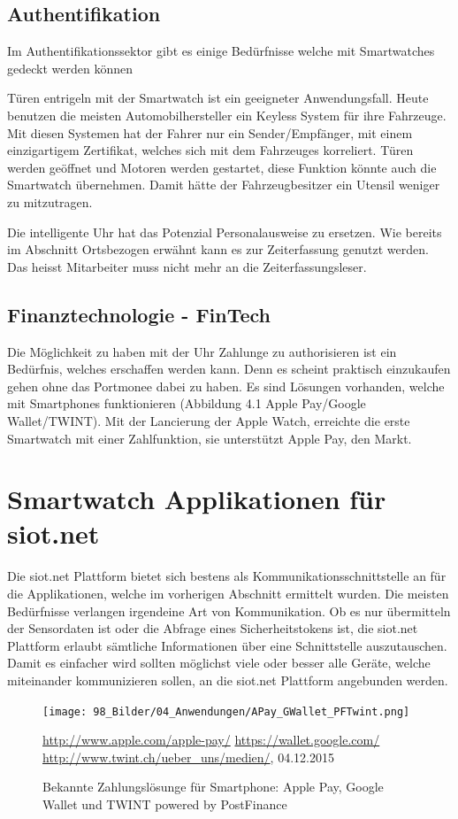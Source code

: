 \subsection{Authentifikation}
Im Authentifikationssektor gibt es einige Bedürfnisse welche mit Smartwatches gedeckt werden können

Türen entrigeln mit der Smartwatch ist ein geeigneter Anwendungsfall. Heute benutzen die meisten Automobilhersteller ein Keyless System für ihre Fahrzeuge. Mit diesen Systemen hat der Fahrer nur ein Sender/Empfänger, mit einem einzigartigem Zertifikat, welches sich mit dem Fahrzeuges korreliert. Türen werden geöffnet und Motoren werden gestartet, diese Funktion könnte auch die Smartwatch übernehmen. Damit hätte der Fahrzeugbesitzer ein Utensil weniger zu mitzutragen.

Die intelligente Uhr hat das Potenzial Personalausweise zu ersetzen. Wie bereits im Abschnitt Ortsbezogen erwähnt kann es zur Zeiterfassung genutzt werden. Das heisst Mitarbeiter muss nicht mehr an die Zeiterfassungsleser.

\subsection{Finanztechnologie - FinTech}
Die Möglichkeit zu haben mit der Uhr Zahlunge zu authorisieren ist ein Bedürfnis, welches erschaffen werden kann. Denn es scheint praktisch einzukaufen gehen ohne das Portmonee dabei zu haben. Es sind Lösungen vorhanden, welche mit Smartphones funktionieren {(Abbildung 4.1 Apple Pay/Google Wallet/TWINT)}. Mit der Lancierung der Apple Watch, erreichte die erste Smartwatch mit einer Zahlfunktion, sie unterstützt Apple Pay, den Markt.

\section{Smartwatch Applikationen für siot.net}
Die siot.net Plattform bietet sich bestens als Kommunikationsschnittstelle an für die Applikationen, welche im vorherigen Abschnitt ermittelt wurden. Die meisten Bedürfnisse verlangen irgendeine Art von Kommunikation. Ob es nur übermitteln der Sensordaten ist oder die Abfrage eines Sicherheitstokens ist, die siot.net Plattform erlaubt sämtliche Informationen über eine Schnittstelle auszutauschen. Damit es einfacher wird sollten möglichst viele oder besser alle Geräte, welche miteinander kommunizieren sollen, an die siot.net Plattform angebunden werden.
\begin{figure}[h]
  \centering
  \texttt{[image: 98\_Bilder/04\_Anwendungen/APay\_GWallet\_PFTwint.png]}
  \caption[Mobile Zahlungslösungen: Apple Pay, Google Wallet und TWINT powered by PostFinance]{Bekannte Zahlungslösunge für Smartphone: Apple Pay, Google Wallet und TWINT powered by PostFinance}
  \footnotesize \url{http://www.apple.com/apple-pay/} \url{https://wallet.google.com/} \url{http://www.twint.ch/ueber_uns/medien/}, 04.12.2015
\end{figure}

